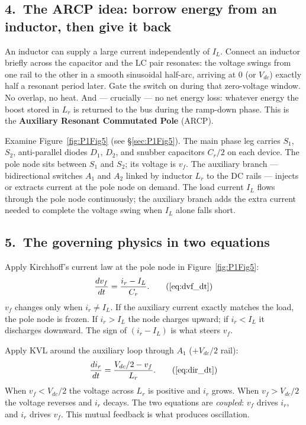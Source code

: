 \documentclass[12pt, a4paper]{article}
\newcommand{\Vdc}{V_{dc}}
\newcommand{\vf}{v_f}
\newcommand{\ir}{i_r}
\newcommand{\IL}{I_L}
\newcommand{\Lr}{L_r}
\newcommand{\Cr}{C_r}
\newcommand{\figref}[1]{Figure~\ref{#1}}
\begin{document}
\subsection*{4.\ The ARCP idea: borrow energy from an inductor, then give it
               back}

An inductor can supply a large current independently of $\IL$.
Connect an inductor briefly across the capacitor and the LC pair resonates:
the voltage swings from one rail to the other in a smooth sinusoidal half-arc,
arriving at 0 (or $\Vdc$) exactly half a resonant period later.
Gate the switch on during that zero-voltage window.
No overlap, no heat.
And --- crucially --- no net energy loss: whatever energy the boost stored in
$\Lr$ is returned to the bus during the ramp-down phase.
This is the \textbf{Auxiliary Resonant Commutated Pole} (ARCP).

Examine \figref{fig:P1Fig5} (see \S\ref{sec:P1Fig5}).
The main phase leg carries $S_1$, $S_2$, anti-parallel diodes $D_1$, $D_2$,
and snubber capacitors $C_r/2$ on each device.
The pole node sits between $S_1$ and $S_2$; its voltage is $\vf$.
The auxiliary branch --- bidirectional switches $A_1$ and $A_2$ linked by
inductor $\Lr$ to the DC rails --- injects or extracts current at the pole
node on demand.
The load current $\IL$ flows through the pole node continuously; the auxiliary
branch adds the extra current needed to complete the voltage swing when $\IL$
alone falls short.

\subsection*{5.\ The governing physics in two equations}

Apply Kirchhoff's current law at the pole node in \figref{fig:P1Fig5}:
\begin{equation}
    \frac{d\vf}{dt} = \frac{\ir - \IL}{\Cr}.
    \tag{\ref{eq:dvf_dt}}
\end{equation}
$\vf$ changes only when $\ir \neq \IL$.
If the auxiliary current exactly matches the load, the pole node is frozen.
If $\ir > \IL$ the node charges upward; if $\ir < \IL$ it discharges
downward.
The sign of $(\ir - \IL)$ is what steers $\vf$.

Apply KVL around the auxiliary loop through $A_1$ ($+\Vdc/2$ rail):
\begin{equation}
    \frac{d\ir}{dt} = \frac{\Vdc/2 - \vf}{\Lr}.
    \tag{\ref{eq:dir_dt}}
\end{equation}
When $\vf < \Vdc/2$ the voltage across $\Lr$ is positive and $\ir$ grows.
When $\vf > \Vdc/2$ the voltage reverses and $\ir$ decays.
The two equations are \emph{coupled}: $\vf$ drives $\ir$, and $\ir$ drives
$\vf$.
This mutual feedback is what produces oscillation.
\end{document}
